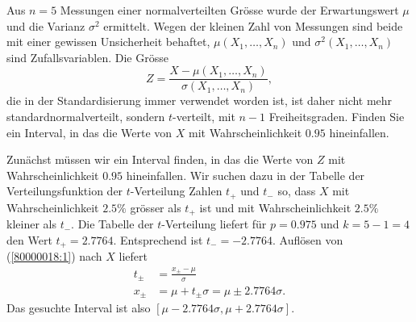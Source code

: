 Aus $n=5$ Messungen einer normalverteilten Grösse wurde der Erwartungswert
$\mu$ und die Varianz $\sigma^2$ ermittelt.
Wegen der kleinen Zahl von Messungen sind beide mit einer gewissen
Unsicherheit behaftet, $\mu(X_1,\dots,X_n)$ und  $\sigma^2(X_1,\dots,X_n)$
sind Zufallsvariablen.
Die Grösse
\begin{equation}
Z=\frac{X-\mu(X_1,\dots,X_n)}{\sigma(X_1,\dots,X_n)},
\label{80000018:1}
\end{equation}
die in der Standardisierung immer verwendet worden ist, ist daher
nicht mehr standardnormalverteilt, sondern $t$-verteilt, mit $n-1$ 
Freiheitsgraden. Finden Sie ein Interval, in das die Werte von $X$
mit Wahrscheinlichkeit $0.95$ hineinfallen.


\begin{loesung}
Zunächst müssen wir ein Interval finden, in das die Werte von
$Z$ mit Wahrscheinlichkeit $0.95$ hineinfallen. Wir suchen dazu in
der Tabelle der Verteilungsfunktion der $t$-Verteilung Zahlen $t_+$
und $t_-$ so, dass $X$ mit Wahrscheinlichkeit $2.5\%$ grösser als $t_+$
ist und mit Wahrscheinlichkeit $2.5\%$ kleiner als $t_-$. Die Tabelle
der $t$-Verteilung liefert für $p=0.975$ und $k=5-1=4$ den Wert
$t_+=2.7764$. Entsprechend ist $t_-=-2.7764$. Auflösen von
(\ref{80000018:1}) nach $X$ liefert
\begin{align*}
t_\pm &=\frac{x_{\pm}-\mu}{\sigma}\\
x_\pm&=\mu +t_\pm\sigma = \mu \pm 2.7764\sigma.
\end{align*}
Das gesuchte Interval ist also $[\mu-2.7764\sigma,\mu+2.7764\sigma]$.
\end{loesung}

